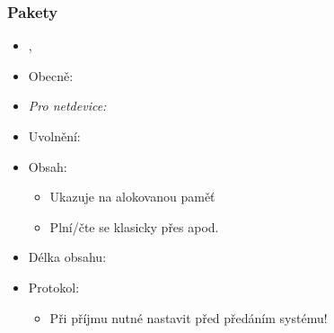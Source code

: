\begin{frame}
  \frametitle{Pakety}

  \begin{itemize}
    \item {}, 
    \item Obecně: 

    \pause

    \item \emph{Pro netdevice:} 

    \pause

    \item Uvolnění: 

    \pause

    \item Obsah: 
    \begin{itemize}
      \item Ukazuje na alokovanou paměť
      \item Plní/čte se klasicky přes  apod.
    \end{itemize}

    \pause

    \item Délka obsahu: 

    \pause

    \item Protokol: 
    \begin{itemize}
      \item Při příjmu nutné nastavit před předáním systému!
    \end{itemize}
  \end{itemize}

\end{frame}

